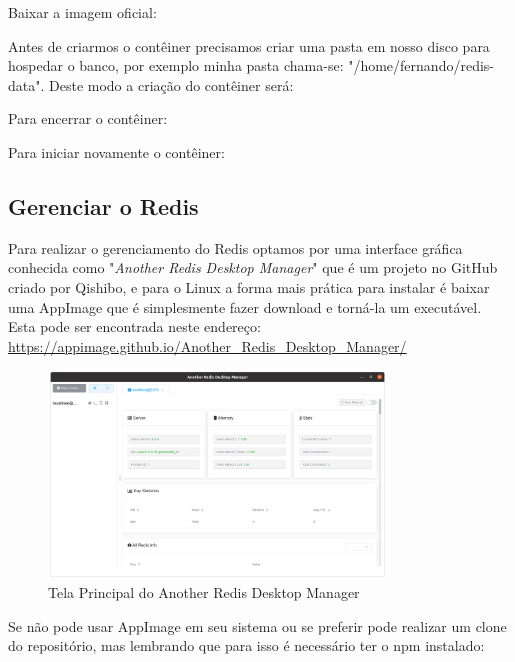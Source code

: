 \documentclass[a4paper,11pt]{article}
\begin{document}
Baixar a imagem oficial: \\

Antes de criarmos o contêiner precisamos criar uma pasta em nosso disco para hospedar o banco, por exemplo minha pasta chama-se: "/home/fernando/redis-data". Deste modo a criação do contêiner será: \\

Para encerrar o contêiner: \\

Para iniciar novamente o contêiner: \\

\subsection{Gerenciar o Redis}
Para realizar o gerenciamento do Redis optamos por uma interface gráfica conhecida como "\textit{Another Redis Desktop Manager}"\cite{ardmoficial} que é um projeto no GitHub criado por Qishibo, e para o Linux a forma mais prática para instalar é baixar uma AppImage que é simplesmente fazer download e torná-la um executável. Esta pode ser encontrada neste endereço: \url{https://appimage.github.io/Another_Redis_Desktop_Manager/}
\begin{figure}[H]
	\centering
	\includegraphics[width=0.8\textwidth]{imagens/ARDM}
	\caption{Tela Principal do Another Redis Desktop Manager}
\end{figure}

Se não pode usar AppImage em seu sistema ou se preferir pode realizar um clone do repositório, mas lembrando que para isso é necessário ter o npm instalado: \\
 \\
\end{document}
